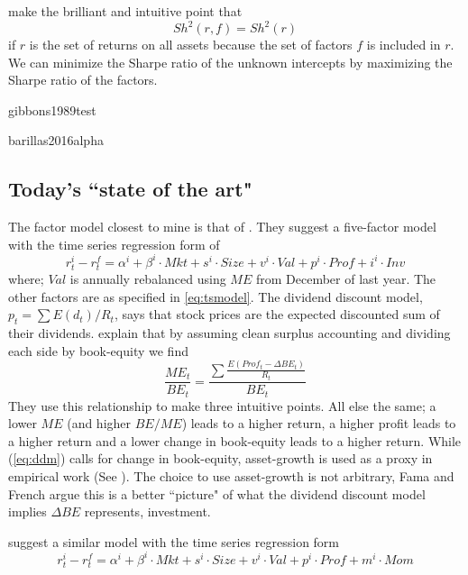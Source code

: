 \textcite{barillas2016alpha} make the brilliant and intuitive point that
\[
Sh^2(r,f) = Sh^2(r)
\]
if $r$ is the set of returns on all assets because the set of factors $f$ is
included in $r$.
We can minimize the Sharpe ratio of the unknown intercepts by maximizing the
Sharpe ratio of the factors.

{gibbons1989test}

{barillas2016alpha}



\subsection{Today's ``state of the art"}

The factor model closest to mine is that of \textcite{fama2016choosing}.
They suggest a five-factor model with the time series regression form of
\begin{equation}
\label{eq:tsFF2016}
r_t^i - r_t^f= \alpha^i + \beta^i \cdot Mkt + s^i \cdot Size + v^i \cdot Val + p^i \cdot Prof 
+ i^i \cdot Inv
\end{equation}
where; $Val$ is annually rebalanced using $ME$ from December of last year.
The other factors are as specified in \ref{eq:tsmodel}.
The dividend discount model, $p_t = \sum E(d_t)/R_t$, says that stock prices are the expected 
discounted sum of their dividends.
\textcite{fama2006profitability} explain that by assuming clean surplus accounting and 
dividing each side by book-equity we find
\begin{equation}
\label{eq:ddm}
\frac{ME_t}{BE_t} = \frac{\sum \frac{E(Prof_t-\Delta BE_t)}{R_t}}{BE_t}
\end{equation}
They use this relationship to make three intuitive points.
All else the same;
a lower $ME$ (and higher $BE/ME$) leads to a higher return,
a higher profit leads to a higher return and
a lower change in book-equity leads to a higher return.
While (\ref{eq:ddm}) calls for change in book-equity, asset-growth is used as a proxy in 
empirical work (See \textcite{fama2015five, fama2016choosing, fama2017international}).
The choice to use asset-growth is not arbitrary, Fama and French argue this is a better 
``picture" of what the dividend discount model implies $\Delta BE$ represents, 
investment.

\textcite{ball2016accruals} suggest a similar model with the time series regression form
\begin{equation}
\label{eq:tsBall2016}
r_t^i - r_t^f= \alpha^i + \beta^i \cdot Mkt + s^i \cdot Size + v^i \cdot Val + p^i \cdot Prof 
+ m^i \cdot Mom
\end{equation}

